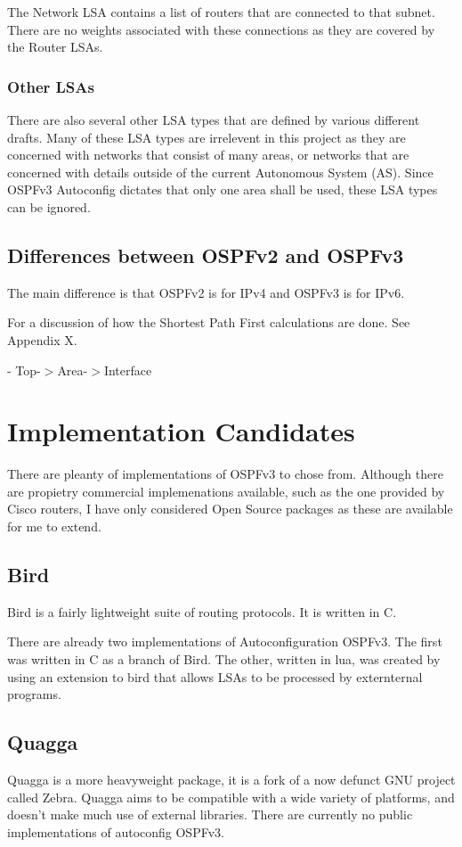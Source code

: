 \documentclass[12pt]{report}
\begin{document}
The Network LSA contains a list of routers that are connected to that subnet. There are no weights associated with these connections as they are covered by the Router LSAs. 

\subsubsection{Other LSAs}
There are also several other LSA types that are defined by various different drafts. 
Many of these LSA types are irrelevent in this project as they are concerned with 
networks that consist of many areas, or networks that are concerned with details 
outside of the current Autonomous System (AS). Since OSPFv3 Autoconfig dictates that 
only one area shall be used, these LSA types can be ignored.   

\subsection{Differences between OSPFv2 and OSPFv3}
The main difference is that OSPFv2 is for IPv4 and OSPFv3 is for IPv6. 

For a discussion of how the Shortest Path First calculations are done. See Appendix 
X. 

- Top-$>$Area-$>$Interface

\section{Implementation Candidates}
There are pleanty of implementations of OSPFv3 to chose from. Although there are 
propietry commercial implemenations available, such as the one provided by Cisco 
routers, I have only considered Open Source packages as these are available for me 
to extend.

\subsection{Bird}
Bird is a fairly lightweight suite of routing protocols. It is written in C. 

There are already two implementations of Autoconfiguration OSPFv3. The first was 
written in C as a branch of Bird. The other, written in lua, was created by using an 
extension to bird that allows LSAs to be processed by externternal programs.

\subsection{Quagga}
Quagga is a more heavyweight package, it is a fork of a now defunct GNU project 
called Zebra. Quagga aims to be compatible with a wide variety of platforms, and 
doesn't make much use of external libraries. There are currently no public
implementations of autoconfig OSPFv3.
\end{document}
